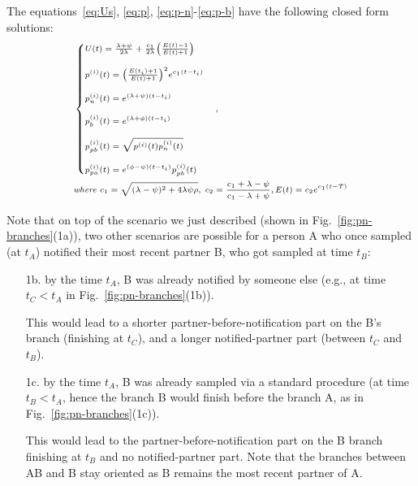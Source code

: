 \documentclass[10pt,letterpaper]{article}
\begin{document}
The equations~\ref{eq:Us}, \ref{eq:p}, \ref{eq:p-n}-\ref{eq:p-b} have the following closed form solutions:
\begin{equation}
\scriptsize
\begin{split}
&\begin{cases}
U(t) = \frac{\lambda + \psi}{2\lambda} +  \frac{c_1}{2\lambda}\Big(\frac{E(t) - 1}{E(t) + 1}\Big)\\
\\
p^{(i)}(t) = \Big(\frac{E(t_i) + 1}{E(t) + 1}\Big)^2 e^{c_1 (t -t_i)} \\
\\
p_n^{(i)}(t) =  e^{(\lambda + \psi) (t -t_i)}\\
\\
p_b^{(i)}(t) =  e^{(\lambda + \phi) (t -t_i)}
\\
\\
p_{pb}^{(i)}(t) =  \sqrt{p^{(i)}(t)p_n^{(i)}(t)} \\
\\
p_{pa}^{(i)}(t) =  e^{(\phi-\psi) (t -t_i)} p_{pb}^{(i)}(t) 
\end{cases},\\
& \textit{where } c_1 = \sqrt{(\lambda - \psi)^2 + 4 \lambda\psi\rho},\; c_2 = \frac{c_1 + \lambda - \psi}{c_1 - \lambda + \psi}, E(t) = c_2 e^{c_1 (t -T)} \\
\end{split}\label{eq:ps}
\end{equation}



Note that on top of the scenario we just described (shown in Fig.~\ref{fig:pn-branches}(1a)), two other scenarios are possible for a person A who once sampled (at $t_A$) notified their most recent partner B, who got sampled at time $t_B$:
\begin{enumerate}

\item[1b.] by the time $t_A$, B was already notified by someone else (e.g., at time $t_C < t_A$ in  Fig.~\ref{fig:pn-branches}(1b)).

This would lead to a shorter partner-before-notification part on the B's branch (finishing at $t_C$), and a longer notified-partner part (between $t_C$ and $t_B$). 
 

\item[1c.] by the time $t_A$, B was already sampled via a standard procedure (at time $t_B < t_A$, hence the branch B would finish before the branch A, as in Fig.~\ref{fig:pn-branches}(1c)).

This would lead to the partner-before-notification part on the B branch finishing at $t_B$ and no notified-partner part. Note that the branches between AB and B stay oriented as B remains the most recent partner of A.
\end{enumerate}
\end{document}

